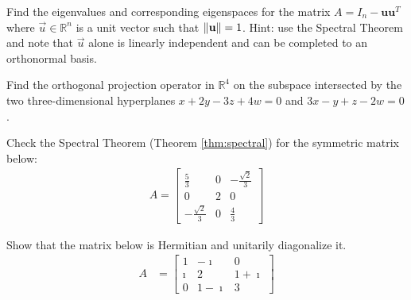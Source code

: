 \begin{Exercise}
Find the eigenvalues and corresponding eigenspaces for the matrix $A = I_n - \textbf{u}\textbf{u}^T$ where $\vec{u} \in \mathbb{R}^n$ is a unit vector such that $\norm{\textbf{u}} = 1$. Hint: use the Spectral Theorem and note that $\vec{u}$ alone is linearly independent and can be completed to an orthonormal basis.
\end{Exercise}

\begin{Exercise}
Find the orthogonal projection operator in $\mathbb{R}^4$ on the subspace intersected by the two three-dimensional hyperplanes $x + 2y - 3z + 4w = 0$ and $3x - y + z - 2w = 0$.
\end{Exercise}

\begin{Exercise}
Check the Spectral Theorem (Theorem \ref{thm:spectral}) for the symmetric matrix below:
\begin{align*}
A = 
\begin{bmatrix}
\frac{5}{3}&0&-\frac{\sqrt{2}}{3}\\ 
0&2&0\\ 
-\frac{\sqrt{2}}{3}&0&\frac{4}{3}
\end{bmatrix}
\end{align*}
\end{Exercise}

\begin{Exercise}
Show that the matrix below is Hermitian and unitarily diagonalize it.
\begin{align*}
A &=
\begin{bmatrix}
1 & -\imath & 0 \\
\imath & 2 & 1+\imath \\
0 & 1-\imath & 3 
\end{bmatrix}
\end{align*}
\end{Exercise}

